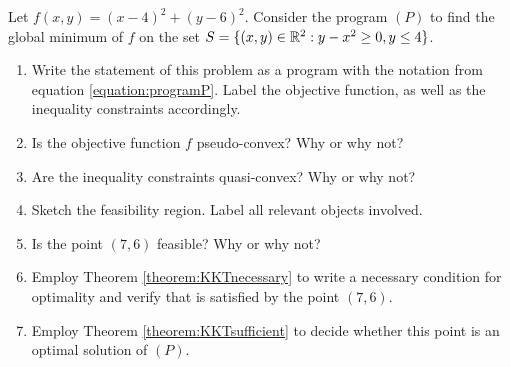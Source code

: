 
\begin{problem}[Basic]\cite[lec6\_constr\_opt, 10]{Freund2004nonlinear}
Let $f(x,y)=(x-4)^2+(y-6)^2$.  Consider the program $(P)$ to find the global minimum of $f$ on the set $S = \{ (x,y) \in \mathbb{R}^2 : y-x^2\geq 0, y\leq 4 \}$.
\begin{enumerate}
	\item Write the statement of this problem as a program with the notation from equation \ref{equation:programP}.  Label the objective function, as well as the inequality constraints accordingly.
	\item Is the objective function $f$ pseudo-convex? Why or why not?
	\item Are the inequality constraints quasi-convex?  Why or why not?
	\item Sketch the feasibility region.  Label all relevant objects involved.
	\item Is the point $(7,6)$ feasible?  Why or why not?
	\item Employ Theorem \ref{theorem:KKTnecessary} to write a necessary condition for optimality and verify that is satisfied by the point $(7,6)$.
	\item Employ Theorem \ref{theorem:KKTsufficient} to decide whether this point is an optimal solution of $(P)$.
\end{enumerate}
\end{problem}


